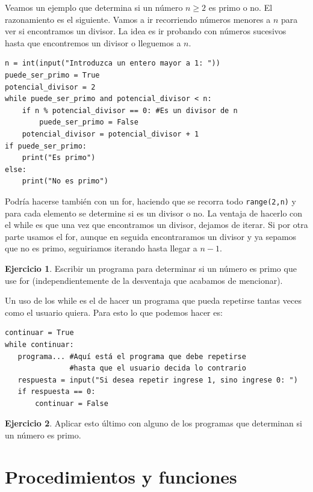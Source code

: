\documentclass[a4paper, 12pt]{report}
\theoremstyle{definition}
\newtheorem{ejercicio}{Ejercicio}[section]
\begin{document}
Veamos un ejemplo que determina si un número $n\geq 2$ es primo o no. El razonamiento es el siguiente. Vamos a ir recorriendo números menores a $n$ para ver si encontramos un divisor. La idea es ir probando con números sucesivos hasta que encontremos un divisor o lleguemos a $n$.
\begin{verbatim}
n = int(input("Introduzca un entero mayor a 1: "))
puede_ser_primo = True
potencial_divisor = 2
while puede_ser_primo and potencial_divisor < n:
    if n % potencial_divisor == 0: #Es un divisor de n
        puede_ser_primo = False
    potencial_divisor = potencial_divisor + 1
if puede_ser_primo:
    print("Es primo")
else:
    print("No es primo")
\end{verbatim}
Podría hacerse también con un for, haciendo que se recorra todo {\tt range(2,n)} y para cada elemento se determine si es un divisor o no. La ventaja de hacerlo con el while es que una vez que encontramos un divisor, dejamos de iterar. Si por otra parte usamos el for, aunque en seguida encontraramos un divisor y ya sepamos que no es primo, seguiriamos iterando hasta llegar a $n-1$.
\begin{ejercicio}
	Escribir un programa para determinar si un número es primo que use for (independientemente de la desventaja que acabamos de mencionar).
\end{ejercicio}

Un uso de los while es el de hacer un programa que pueda repetirse tantas veces como el usuario quiera. Para esto lo que podemos hacer es:
\begin{verbatim}
continuar = True
while continuar:
   programa... #Aquí está el programa que debe repetirse
               #hasta que el usuario decida lo contrario
   respuesta = input("Si desea repetir ingrese 1, sino ingrese 0: ")
   if respuesta == 0:
       continuar = False
\end{verbatim}
\begin{ejercicio}
	Aplicar esto último con alguno de los programas que determinan si un número es primo.
\end{ejercicio}
\section{Procedimientos y funciones}
\end{document}
